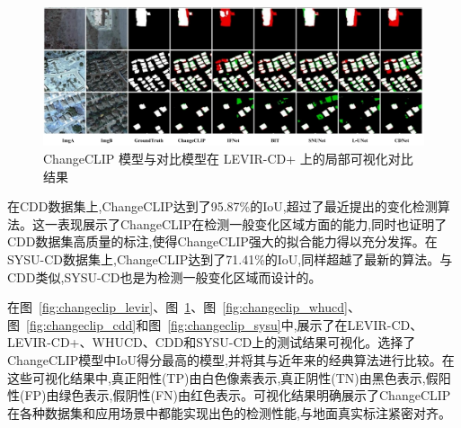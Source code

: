 \begin{figure}[!htbp]
  \centering
  \includegraphics[width=\textwidth]{paper_figures/基于AI基础模型微调的变化检测模型研究/ChangeCLIP/changeclip_levirplus.png}
  \caption{ChangeCLIP 模型与对比模型在 LEVIR-CD+ 上的局部可视化对比结果}
  \label{fig:changeclip_levirplus}
\end{figure}

在CDD数据集上,ChangeCLIP达到了95.87\%的IoU,超过了最近提出的变化检测算法。这一表现展示了ChangeCLIP在检测一般变化区域方面的能力,同时也证明了CDD数据集高质量的标注,使得ChangeCLIP强大的拟合能力得以充分发挥。在SYSU-CD数据集上,ChangeCLIP达到了71.41\%的IoU,同样超越了最新的算法。与CDD类似,SYSU-CD也是为检测一般变化区域而设计的。

在图~\ref{fig:changeclip_levir}、图~\ref{fig:changeclip_levirplus}、图~\ref{fig:changeclip_whucd}、图~\ref{fig:changeclip_cdd}和图~\ref{fig:changeclip_sysu}中,展示了在LEVIR-CD、LEVIR-CD+、WHUCD、CDD和SYSU-CD上的测试结果可视化。选择了ChangeCLIP模型中IoU得分最高的模型,并将其与近年来的经典算法进行比较。在这些可视化结果中,真正阳性(TP)由白色像素表示,真正阴性(TN)由黑色表示,假阳性(FP)由绿色表示,假阴性(FN)由红色表示。可视化结果明确展示了ChangeCLIP在各种数据集和应用场景中都能实现出色的检测性能,与地面真实标注紧密对齐。

